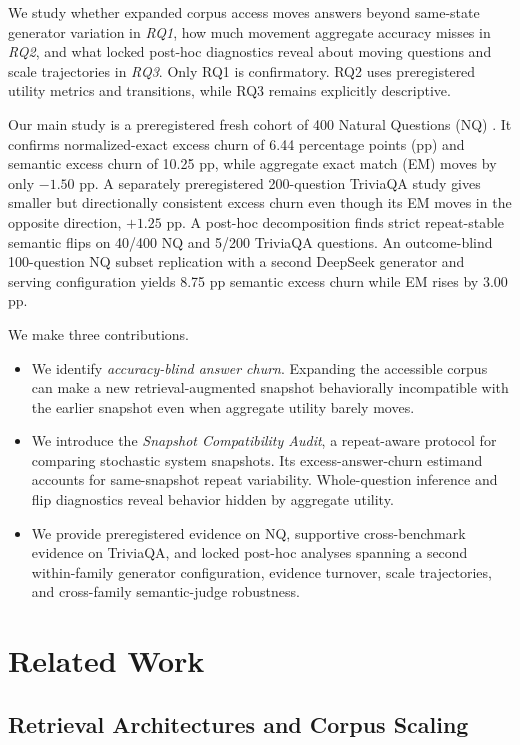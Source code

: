 \documentclass[sigconf,nonacm]{acmart}
\begin{document}
We study whether expanded corpus access moves answers beyond same-state generator variation in \emph{RQ1}, how much movement aggregate accuracy misses in \emph{RQ2}, and what locked post-hoc diagnostics reveal about moving questions and scale trajectories in \emph{RQ3}. Only RQ1 is confirmatory. RQ2 uses preregistered utility metrics and transitions, while RQ3 remains explicitly descriptive.

Our main study is a preregistered fresh cohort of 400 Natural Questions (NQ) \cite{kwiatkowski2019nq}. It confirms normalized-exact excess churn of 6.44 percentage points (pp) and semantic excess churn of 10.25 pp, while aggregate exact match (EM) moves by only $-1.50$ pp. A separately preregistered 200-question TriviaQA study \cite{joshi2017triviaqa} gives smaller but directionally consistent excess churn even though its EM moves in the opposite direction, $+1.25$ pp. A post-hoc decomposition finds strict repeat-stable semantic flips on 40/400 NQ and 5/200 TriviaQA questions. An outcome-blind 100-question NQ subset replication with a second DeepSeek generator and serving configuration yields 8.75 pp semantic excess churn while EM rises by 3.00 pp.

We make three contributions.
\begin{itemize}
\item We identify \emph{accuracy-blind answer churn}. Expanding the accessible corpus can make a new retrieval-augmented snapshot behaviorally incompatible with the earlier snapshot even when aggregate utility barely moves.
\item We introduce the \emph{Snapshot Compatibility Audit}, a repeat-aware protocol for comparing stochastic system snapshots. Its excess-answer-churn estimand accounts for same-snapshot repeat variability. Whole-question inference and flip diagnostics reveal behavior hidden by aggregate utility.
\item We provide preregistered evidence on NQ, supportive cross-benchmark evidence on TriviaQA, and locked post-hoc analyses spanning a second within-family generator configuration, evidence turnover, scale trajectories, and cross-family semantic-judge robustness.
\end{itemize}

\section{Related Work}
\label{sec:related}

\subsection{Retrieval Architectures and Corpus Scaling}
\end{document}
